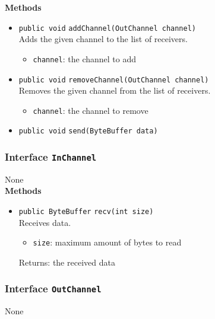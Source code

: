 \textbf{Methods}
\begin{itemize}
\item \lstinline|public void| \lstinline|addChannel|\lstinline|(OutChannel channel)|\\
Adds the given channel to the list of receivers.
\begin{itemize}
\item \lstinline|channel|: the channel to add
\end{itemize}



\item \lstinline|public void| \lstinline|removeChannel|\lstinline|(OutChannel channel)|\\
Removes the given channel from the list of receivers.
\begin{itemize}
\item \lstinline|channel|: the channel to remove
\end{itemize}



\item \lstinline|public void| \lstinline|send|\lstinline|(ByteBuffer data)|




\end{itemize}

\subsubsection{Interface \lstinline|InChannel|}
None \\





\textbf{Methods}
\begin{itemize}
\item \lstinline|public ByteBuffer| \lstinline|recv|\lstinline|(int size)|\\
Receives data.
\begin{itemize}
\item \lstinline|size|: maximum amount of bytes to read
\end{itemize}

Returns: the received data

\end{itemize}

\subsubsection{Interface \lstinline|OutChannel|}
None \\





